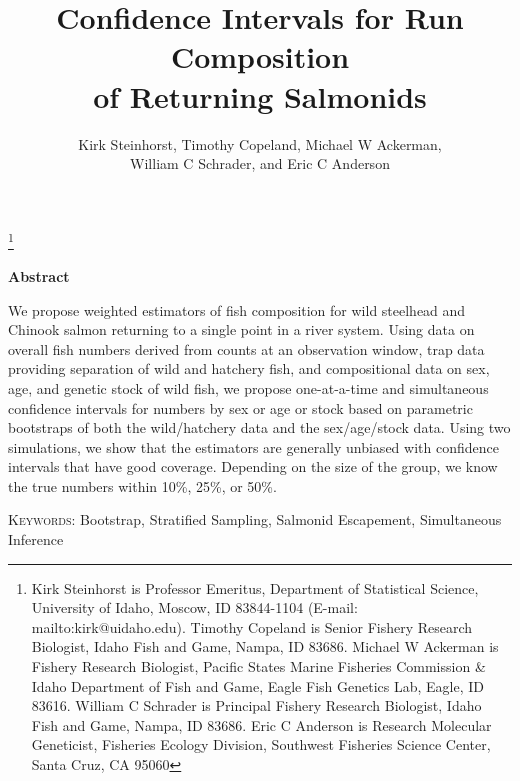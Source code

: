\documentclass[12pt]{article}
\begin{document}
\title{Confidence Intervals for Run Composition \\ of Returning Salmonids}
\author{Kirk Steinhorst, Timothy Copeland, Michael W Ackerman,\\ William C Schrader, and Eric C Anderson}
\maketitle

\footnote{Kirk Steinhorst is Professor Emeritus, Department of Statistical Science, University of Idaho, Moscow, ID 83844-1104 (E-mail: mailto:kirk@uidaho.edu). Timothy Copeland is Senior Fishery Research Biologist, Idaho Fish and Game, Nampa, ID 83686. Michael W Ackerman is Fishery Research Biologist, Pacific States Marine Fisheries Commission \& Idaho Department of Fish and Game, Eagle Fish Genetics Lab, Eagle, ID 83616. William C Schrader is Principal Fishery Research Biologist, Idaho Fish and Game, Nampa, ID 83686. Eric C Anderson is Research Molecular Geneticist, Fisheries Ecology Division, Southwest Fisheries Science Center, Santa Cruz, CA 95060}


\newpage
\begin{center}
\textbf{Abstract}
\end{center}
We propose weighted estimators of fish composition for wild steelhead and Chinook salmon returning to a single point in a river system.  Using data on overall fish numbers derived from counts at an observation window, trap data providing separation of wild and hatchery fish, and compositional data on sex, age, and genetic stock of wild fish, we propose one-at-a-time and simultaneous confidence intervals for numbers by sex or age or stock based on parametric bootstraps of both the wild/hatchery data and the sex/age/stock data.  Using two simulations, we show that the estimators are generally unbiased with confidence intervals that have good coverage.  Depending on the size of the group, we know the true numbers within 10\%, 25\%, or 50\%.

\vspace*{.3in}

\noindent\textsc{Keywords}: {Bootstrap, Stratified Sampling, Salmonid Escapement, Simultaneous Inference}

\newpage
\end{document}
